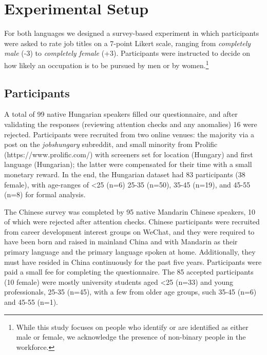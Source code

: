 \documentclass[runningheads]{llncs}
\begin{document}
\section{Experimental Setup}\label{sec:experiment_setup}

For both languages we designed a survey-based experiment in which participants were asked to rate job titles on a 7-point Likert scale, ranging from \textit{completely male} (-3) to \textit{completely female} (+3). Participants were instructed to decide on how likely an occupation is to be pursued by men or by women.\footnote{While this study focuses on people who identify or are identified as either male or female, we acknowledge the presence of non-binary people in the workforce.}

\subsection{Participants}

A total of 99 native Hungarian speakers filled our questionnaire, and after validating the responses (reviewing attention checks and any anomalies) 16 were rejected. Participants were recruited from two online venues: the majority via a post on the \textit{jobshungary} subreddit, and small minority from Prolific (https://www.prolific.com/) with screeners set for location (Hungary) and first language (Hungarian); the latter were compensated for their time with a small monetary reward. In the end, the Hungarian dataset had 83 participants (38 female), with age-ranges of <25 (n=6) 25-35 (n=50), 35-45 (n=19), and 45-55 (n=8) for formal analysis. 


The Chinese survey was completed by 95 native Mandarin Chinese speakers, 10 of which were rejected after attention checks. Chinese participants were recruited from career development interest groups on WeChat, and they were required to have been born and raised in mainland China and with Mandarin as their primary language and the primary language spoken at home. Additionally, they must have resided in China continuously for the past five years. Participants were paid a small fee for completing the questionnaire. The 85 accepted participants (10 female) were mostly university students aged <25 (n=33) and young professionals, 25-35 (n=45), with a few from older age groups, such 35-45 (n=6) and 45-55 (n=1). 

\end{document}
